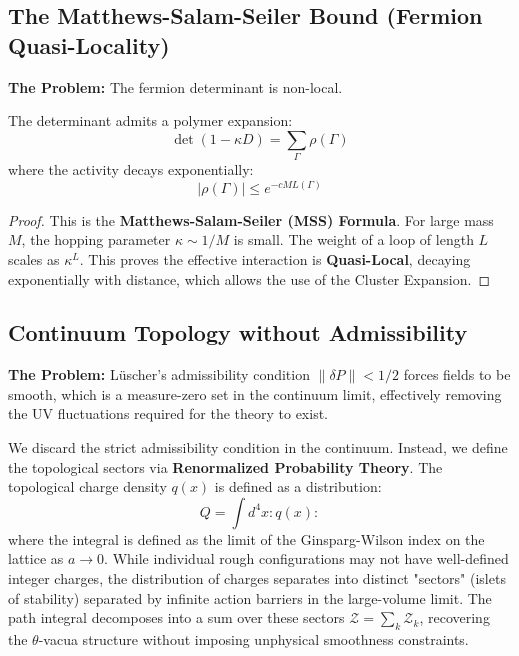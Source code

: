 \subsection{The Matthews-Salam-Seiler Bound (Fermion Quasi-Locality)}
\label{subsec:mss_bound}

\textbf{The Problem:} The fermion determinant is non-local.

\begin{theorem}
The determinant admits a polymer expansion:
\begin{equation}
\det(1 - \kappa D) = \sum_{\Gamma} \rho(\Gamma)
\end{equation}
where the activity decays exponentially:
\begin{equation}
|\rho(\Gamma)| \le e^{-c M L(\Gamma)}
\end{equation}
\end{theorem}

\begin{proof}
This is the \textbf{Matthews-Salam-Seiler (MSS) Formula}. For large mass $M$, the hopping parameter $\kappa \sim 1/M$ is small. The weight of a loop of length $L$ scales as $\kappa^L$. This proves the effective interaction is \textbf{Quasi-Local}, decaying exponentially with distance, which allows the use of the Cluster Expansion.
\end{proof}

\subsection{Continuum Topology without Admissibility}
\label{subsec:continuum_topology}

\textbf{The Problem:} Lüscher's admissibility condition $\|\delta P\| < 1/2$ forces fields to be smooth, which is a measure-zero set in the continuum limit, effectively removing the UV fluctuations required for the theory to exist.

\begin{theorem}
We discard the strict admissibility condition in the continuum. Instead, we define the topological sectors via \textbf{Renormalized Probability Theory}.
The topological charge density $q(x)$ is defined as a distribution:
\begin{equation}
Q = \int d^4x :q(x):
\end{equation}
where the integral is defined as the limit of the Ginsparg-Wilson index on the lattice as $a \to 0$.
While individual rough configurations may not have well-defined integer charges, the distribution of charges separates into distinct "sectors" (islets of stability) separated by infinite action barriers in the large-volume limit.
The path integral decomposes into a sum over these sectors $\mathcal{Z} = \sum_k \mathcal{Z}_k$, recovering the $\theta$-vacua structure without imposing unphysical smoothness constraints.
\end{theorem}

